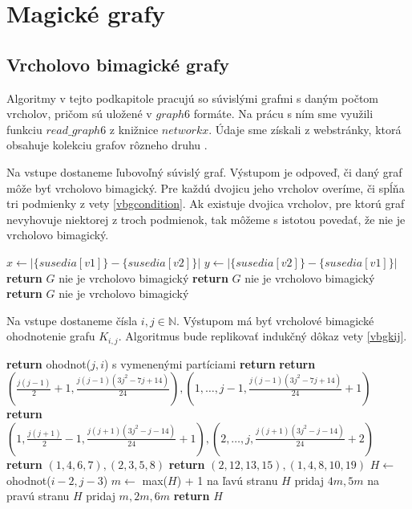 \section{Magické grafy}

\subsection{Vrcholovo bimagické grafy}

Algoritmy v tejto podkapitole pracujú so súvislými grafmi s daným počtom vrcholov, pričom sú uložené v $graph6$ formáte. Na prácu s ním sme využili funkciu $read \_ graph6$ z knižnice $networkx$. Údaje sme získali z webstránky, ktorá obsahuje kolekciu grafov rôzneho druhu \cite{graphlist}. \\
 
\begin{alg}
\label{algvbgcondition}
Na vstupe dostaneme ľubovoľný súvislý graf. Výstupom je odpoveď, či daný graf môže byť vrcholovo bimagický. Pre každú dvojicu jeho vrcholov overíme, či spĺňa tri podmienky z vety \ref{vbgcondition}. Ak existuje dvojica vrcholov, pre ktorú graf nevyhovuje niektorej z troch podmienok, tak môžeme s istotou povedať, že nie je vrcholovo bimagický.
\end{alg}

\begin{algorithmic}
    \STATE $x \gets |\{susedia[v1]\} - \{susedia[v2]\}|$
    \STATE $y \gets |\{susedia[v2]\} - \{susedia[v1]\}|$
	\STATE \textbf{return} $G$ nie je vrcholovo bimagický
    \ENDIF
	\STATE \textbf{return} $G$ nie je vrcholovo bimagický
    \ENDIF
	\STATE \textbf{return} $G$ nie je vrcholovo bimagický
    \ENDIF
\ENDFOR
\end{algorithmic}


\begin{alg}
\label{algvbgkij}
Na vstupe dostaneme čísla $i,j \in \mathbb{N}$. Výstupom má byť vrcholové bimagické ohodnotenie grafu $K_{i,j}$. Algoritmus bude replikovať indukčný dôkaz vety \ref{vbgkij}.
\end{alg}

\begin{algorithmic}
	\STATE \textbf{return} ohodnot($j,i$) s vymenenými partíciami
\ENDIF
{}
	\STATE \textbf{return}
\ENDIF
{}
	\STATE \textbf{return} $(\frac{j(j-1)}{2} + 1, \frac{j(j-1)(3j^2-7j+14)}{24}), (1, \dots , j-1, \frac{j(j-1)(3j^2-7j+14)}{24} + 1)$
\ENDIF
{}
	\STATE \textbf{return} $(1, \frac{j(j+1)}{2} - 1, \frac{j(j+1)(3j^2-j-14)}{24} + 1), (2, \dots , j, \frac{j(j+1)(3j^2-j-14)}{24} + 2)$
\ENDIF
{}
	\STATE \textbf{return} $(1, 4, 6, 7), (2, 3, 5, 8)$
\ENDIF
{}
	\STATE \textbf{return} $(2, 12, 13, 15), (1, 4, 8, 10, 19)$
\ENDIF
\STATE $H \gets$ ohodnot($i - 2, j - 3$)
\STATE $m \gets$ max($H$) + 1
\STATE na ľavú stranu $H$ pridaj $4m, 5m$
\STATE na pravú stranu $H$ pridaj $m, 2m, 6m$
\STATE \textbf{return} $H$
\end{algorithmic}

